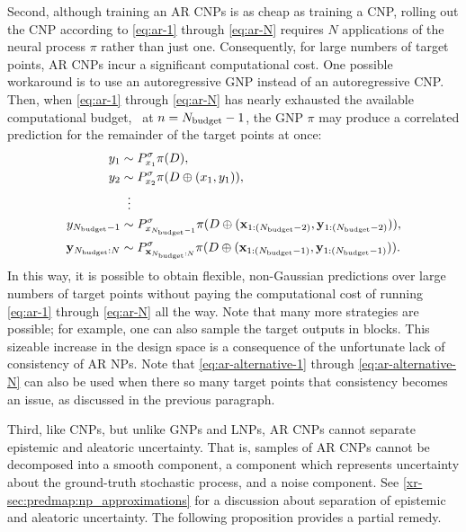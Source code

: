 \documentclass[12pt]{report}
\newcommand{\xrprefix}[1]{xr-#1}
\begin{document}
Second, although training an AR CNPs is as cheap as training a CNP, rolling out the CNP according to \eqref{eq:ar-1} through \eqref{eq:ar-N} requires $N$ applications of the neural process $\pi$ rather than just one. 
Consequently, for large numbers of target points, AR CNPs incur a significant computational cost.
One possible workaround is to use an autoregressive GNP instead of an autoregressive CNP.
Then, when \eqref{eq:ar-1} through \eqref{eq:ar-N} has nearly exhausted the available computational budget, \eg\ at $n = N\ss{budget} - 1$, the GNP $\pi$ may produce a correlated prediction for the remainder of the target points at once:
\begin{align}
    y_1 &\sim P^\sigma_{x_1} \pi(D), \label{eq:ar-alternative-1} \\
    y_2 &\sim P^\sigma_{x_2} \pi(D \oplus (x_1, y_1)), \\
        &\;\;\vdots \nonumber \\
y_{N\ss{budget} -1} &\sim P^\sigma_{x_{N\ss{budget} - 1}} \pi(D \oplus (\vx_{1:(N\ss{budget}-2)}, \vy_{1:(N\ss{budget}-2)})), \\
    \vy_{N\ss{budget}:N} &\sim P^\sigma_{\vx_{N\ss{budget}:N}} \pi(D \oplus (\vx_{1:(N\ss{budget}-1)}, \vy_{1:(N\ss{budget}-1)})). \label{eq:ar-alternative-N}
\end{align}
In this way, it is possible to obtain flexible, non-Gaussian predictions over large numbers of target points without paying the computational cost of running \eqref{eq:ar-1} through \eqref{eq:ar-N} all the way.
Note that many more strategies are possible;
for example, one can also sample the target outputs in blocks.
This sizeable increase in the design space is a consequence of the unfortunate lack of consistency of AR NPs.
Note that \eqref{eq:ar-alternative-1} through \eqref{eq:ar-alternative-N} can also be used when there so many target points that consistency becomes an issue, as discussed in the previous paragraph.

Third, like CNPs, but unlike GNPs and LNPs, AR CNPs cannot separate epistemic and aleatoric uncertainty.
That is, samples of AR CNPs cannot be decomposed into a smooth component, a component which represents uncertainty about the ground-truth stochastic process, and a noise component.
See \cref{\xrprefix{sec:predmap:np_approximations}} for a discussion about separation of epistemic and aleatoric uncertainty.
The following proposition provides a partial remedy.
\end{document}
